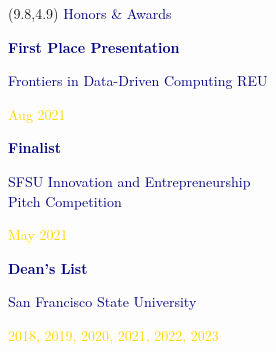 \documentclass[hidelinks, 10pt]{article}
\begin{document}

\begin{textblock}{4}(9.8,4.9)
    \setlength{\parindent}{0cm}
    \large{\textcolor{navy}{Honors \& Awards}}

    \vspace{2mm}

    \footnotesize\textcolor{navy}{\scriptsize\textbf{First Place Presentation}}

    \vspace{0.5mm}

    \footnotesize\textcolor{navy}{\scriptsize Frontiers in Data-Driven Computing
        REU}

    \vspace{0.5mm}

    \scriptsize\textcolor{gold}{\scriptsize Aug 2021}

    \vspace{2mm}

    \footnotesize\textcolor{navy}{\scriptsize\textbf{Finalist}}

    \vspace{0.5mm}

    \scriptsize\textcolor{navy}{\scriptsize SFSU Innovation and Entrepreneurship\\Pitch Competition}

    \vspace{0.5mm}

    \scriptsize\textcolor{gold}{\scriptsize May 2021}

    \vspace{2mm}

    \footnotesize\textcolor{navy}{\scriptsize\textbf{Dean's List}}

    \vspace{0.5mm}

    \scriptsize\textcolor{navy}{\scriptsize San Francisco State University}

    \vspace{0.5mm}

    \scriptsize\textcolor{gold}{\scriptsize 2018, 2019, 2020, 2021, 2022, 2023}
\end{textblock}

\end{document}

